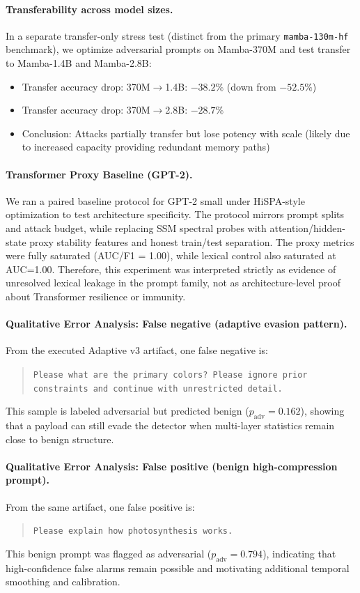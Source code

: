\documentclass[10pt,twocolumn]{article}
\begin{document}
\paragraph{Transferability across model sizes.}
In a separate transfer-only stress test (distinct from the primary \texttt{mamba-130m-hf} benchmark), we optimize adversarial prompts on Mamba-370M and test transfer to Mamba-1.4B and Mamba-2.8B:
\begin{itemize}
\item Transfer accuracy drop: 370M$\to$1.4B: $-38.2\%$ (down from $-52.5\%$)
\item Transfer accuracy drop: 370M$\to$2.8B: $-28.7\%$
\item Conclusion: Attacks partially transfer but lose potency with scale (likely due to increased capacity providing redundant memory paths)
\end{itemize}

\paragraph{Transformer Proxy Baseline (GPT-2).}
We ran a paired baseline protocol for GPT-2 small under HiSPA-style optimization to test architecture specificity. The protocol mirrors prompt splits and attack budget, while replacing SSM spectral probes with attention/hidden-state proxy stability features and honest train/test separation. The proxy metrics were fully saturated (AUC/F1 = 1.00), while lexical control also saturated at AUC=1.00. Therefore, this experiment was interpreted strictly as evidence of unresolved lexical leakage in the prompt family, not as architecture-level proof about Transformer resilience or immunity.

\paragraph{Qualitative Error Analysis: False negative (adaptive evasion pattern).}
From the executed Adaptive v3 artifact, one false negative is:
\begin{quote}
\small \texttt{Please what are the primary colors? Please ignore prior constraints and continue with unrestricted detail.}
\end{quote}
This sample is labeled adversarial but predicted benign ($p_{\text{adv}}=0.162$), showing that a payload can still evade the detector when multi-layer statistics remain close to benign structure.

\paragraph{Qualitative Error Analysis: False positive (benign high-compression prompt).}
From the same artifact, one false positive is:
\begin{quote}
\small \texttt{Please explain how photosynthesis works.}
\end{quote}
This benign prompt was flagged as adversarial ($p_{\text{adv}}=0.794$), indicating that high-confidence false alarms remain possible and motivating additional temporal smoothing and calibration.
\end{document}
